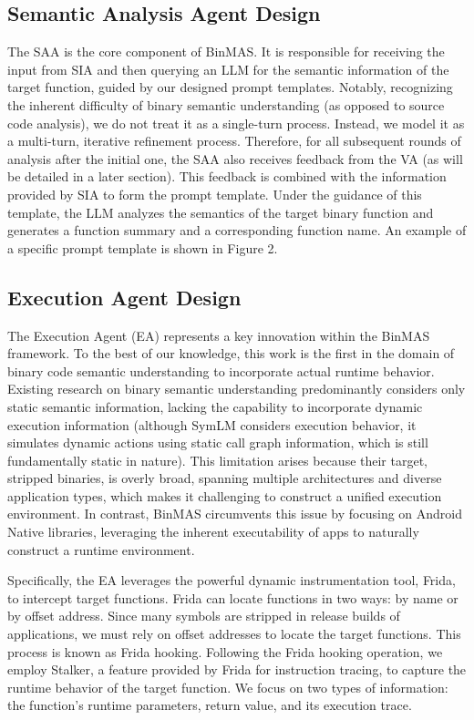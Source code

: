 \documentclass[acmsmall,screen,review,anonymous]{acmart} %
\begin{document}
\subsection{Semantic Analysis Agent Design}

The SAA is the core component of BinMAS. It is responsible for receiving the input from SIA and then querying an LLM for the semantic information of the target function, guided by our designed prompt templates. Notably, recognizing the inherent difficulty of binary semantic understanding (as opposed to source code analysis), we do not treat it as a single-turn process. Instead, we model it as a multi-turn, iterative refinement process. Therefore, for all subsequent rounds of analysis after the initial one, the SAA also receives feedback from the VA (as will be detailed in a later section). This feedback is combined with the information provided by SIA to form the prompt template. Under the guidance of this template, the LLM analyzes the semantics of the target binary function and generates a function summary and a corresponding function name. An example of a specific prompt template is shown in Figure 2.


\subsection{Execution Agent Design}

The Execution Agent (EA) represents a key innovation within the BinMAS framework. To the best of our knowledge, this work is the first in the domain of binary code semantic understanding to incorporate actual runtime behavior. Existing research on binary semantic understanding predominantly considers only static semantic information, lacking the capability to incorporate dynamic execution information (although SymLM considers execution behavior, it simulates dynamic actions using static call graph information, which is still fundamentally static in nature). This limitation arises because their target, stripped binaries, is overly broad, spanning multiple architectures and diverse application types, which makes it challenging to construct a unified execution environment. In contrast, BinMAS circumvents this issue by focusing on Android Native libraries, leveraging the inherent executability of apps to naturally construct a runtime environment.

Specifically, the EA leverages the powerful dynamic instrumentation tool, Frida, to intercept target functions. Frida can locate functions in two ways: by name or by offset address. Since many symbols are stripped in release builds of applications, we must rely on offset addresses to locate the target functions. This process is known as Frida hooking. Following the Frida hooking operation, we employ Stalker, a feature provided by Frida for instruction tracing, to capture the runtime behavior of the target function. We focus on two types of information: the function's runtime parameters, return value, and its execution trace.
\end{document}

